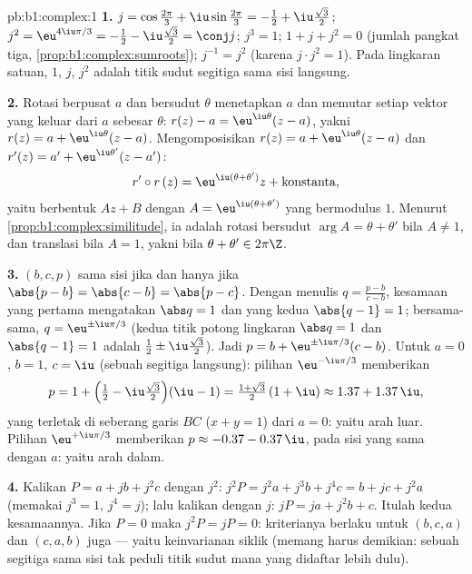 \begin{solution}{pb:b1:complex:1}
\textbf{1.} $j = \cos\frac{2\pi}3 + \iu\sin\frac{2\pi}3 = -\frac12
+ \iu\frac{\sqrt3}2$; $j^2 = \eu^{4\iu\pi/3} = -\frac12 -
\iu\frac{\sqrt3}2 = \conj j$; $j^3 = 1$; $1 + j + j^2 = 0$ (jumlah
 pangkat tiga, \cref{prop:b1:complex:sumroots}); $j^{-1}
= j^2$ (karena $j \cdot j^2 = 1$). Pada lingkaran satuan, $1$, $j$,
$j^2$ adalah titik sudut segitiga sama sisi langsung.

\textbf{2.} Rotasi berpusat $a$ dan bersudut $\theta$ menetapkan $a$
dan memutar setiap vektor yang keluar dari $a$ sebesar $\theta$: $r(z) - a =
\eu^{\iu\theta}(z - a)$, yakni $r(z) = a + \eu^{\iu\theta}(z - a)$.
Mengomposisikan $r(z) = a + \eu^{\iu\theta}(z-a)$ dan $r'(z) = a' +
\eu^{\iu\theta'}(z-a')$:
\[
r' \circ r\,(z) = \eu^{\iu(\theta + \theta')} z +
\text{konstanta},
\]
yaitu  berbentuk $Az + B$ dengan $A = \eu^{\iu(\theta+\theta')}$ yang
bermodulus $1$. Menurut \cref{prop:b1:complex:similitude}, ia adalah rotasi
bersudut $\arg A = \theta + \theta'$ bila $A \neq 1$, dan
translasi bila $A = 1$, yakni bila $\theta + \theta' \in 2\pi\Z$.

\textbf{3.} $(b, c, p)$ sama sisi jika dan hanya jika $\abs{p - b} = \abs{c -
b} = \abs{p - c}$. Dengan menulis $q = \frac{p - b}{c - b}$, kesamaan yang
pertama mengatakan $\abs q = 1$ dan yang kedua $\abs{q - 1} = 1$;
bersama-sama, $q = \eu^{\pm\iu\pi/3}$ (kedua titik potong
lingkaran $\abs q = 1$ dan $\abs{q - 1} = 1$ adalah $\frac12 \pm
\iu\frac{\sqrt3}2$). Jadi $p = b + \eu^{\pm\iu\pi/3}(c - b)$. Untuk
$a = 0$, $b = 1$, $c = \iu$ (sebuah segitiga langsung): pilihan
$\eu^{-\iu\pi/3}$ memberikan
\[
p = 1 + \Bigl(\tfrac12 - \iu\tfrac{\sqrt3}2\Bigr)(\iu - 1)
= \tfrac{1 + \sqrt3}2\,(1 + \iu) \approx 1.37 + 1.37\,\iu ,
\]
yang terletak di seberang garis $BC$ ($x + y = 1$) dari $a
= 0$: yaitu arah luar. Pilihan $\eu^{+\iu\pi/3}$ memberikan $p \approx -0.37
- 0.37\,\iu$, pada sisi yang sama dengan $a$: yaitu arah dalam.

\textbf{4.} Kalikan $P = a + jb + j^2c$ dengan $j^2$: $j^2 P = j^2 a +
j^3 b + j^4 c = b + jc + j^2 a$ (memakai $j^3 = 1$, $j^4 = j$); lalu
kalikan dengan $j$: $jP = ja + j^2 b + c$. Itulah kedua kesamaannya. Jika $P
= 0$ maka $j^2 P = jP = 0$: kriterianya berlaku untuk $(b, c, a)$ dan
$(c, a, b)$ juga --- yaitu keinvarianan siklik (memang harus demikian: sebuah
segitiga sama sisi tak peduli titik sudut mana yang didaftar lebih dulu).


\end{solution}
